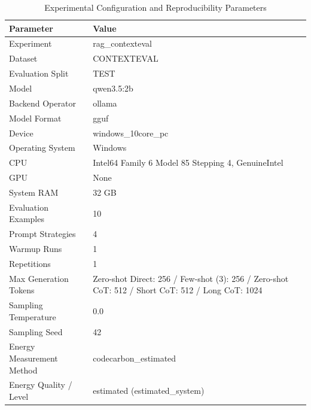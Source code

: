 \begin{table}
\caption{Experimental Configuration and Reproducibility Parameters}
\label{tab:experimental_configuration}
\begin{tabular}{ll}
\toprule
Parameter & Value \\
\midrule
Experiment & rag\_contexteval \\
Dataset & CONTEXTEVAL \\
Evaluation Split & TEST \\
Model & qwen3.5:2b \\
Backend Operator & ollama \\
Model Format & gguf \\
Device & windows\_10core\_pc \\
Operating System & Windows \\
CPU & Intel64 Family 6 Model 85 Stepping 4, GenuineIntel \\
GPU & None \\
System RAM & 32 GB \\
Evaluation Examples & 10 \\
Prompt Strategies & 4 \\
Warmup Runs & 1 \\
Repetitions & 1 \\
Max Generation Tokens & Zero-shot Direct: 256 / Few-shot (3): 256 / Zero-shot CoT: 512 / Short CoT: 512 / Long CoT: 1024 \\
Sampling Temperature & 0.0 \\
Sampling Seed & 42 \\
Energy Measurement Method & codecarbon\_estimated \\
Energy Quality / Level & estimated (estimated\_system) \\
\bottomrule
\end{tabular}
\end{table}
